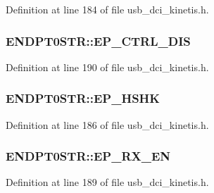 Definition at line 184 of file usb\+\_\+dci\+\_\+kinetis.\+h.

\subsubsection[{\texorpdfstring{E\+P\+\_\+\+C\+T\+R\+L\+\_\+\+D\+IS}{EP_CTRL_DIS}}]{ E\+N\+D\+P\+T0\+S\+T\+R\+::\+E\+P\+\_\+\+C\+T\+R\+L\+\_\+\+D\+IS}\hypertarget{union_e_n_d_p_t0_s_t_r_a8c37453ad6760f4f888d30aa2c6ee190}{}\label{union_e_n_d_p_t0_s_t_r_a8c37453ad6760f4f888d30aa2c6ee190}


Definition at line 190 of file usb\+\_\+dci\+\_\+kinetis.\+h.

\subsubsection[{\texorpdfstring{E\+P\+\_\+\+H\+S\+HK}{EP_HSHK}}]{ E\+N\+D\+P\+T0\+S\+T\+R\+::\+E\+P\+\_\+\+H\+S\+HK}\hypertarget{union_e_n_d_p_t0_s_t_r_ac5164e58504f88bf411f1642dbf7dc59}{}\label{union_e_n_d_p_t0_s_t_r_ac5164e58504f88bf411f1642dbf7dc59}


Definition at line 186 of file usb\+\_\+dci\+\_\+kinetis.\+h.

\subsubsection[{\texorpdfstring{E\+P\+\_\+\+R\+X\+\_\+\+EN}{EP_RX_EN}}]{ E\+N\+D\+P\+T0\+S\+T\+R\+::\+E\+P\+\_\+\+R\+X\+\_\+\+EN}\hypertarget{union_e_n_d_p_t0_s_t_r_a4ca0046b20afc6920982e7703880e499}{}\label{union_e_n_d_p_t0_s_t_r_a4ca0046b20afc6920982e7703880e499}


Definition at line 189 of file usb\+\_\+dci\+\_\+kinetis.\+h.

